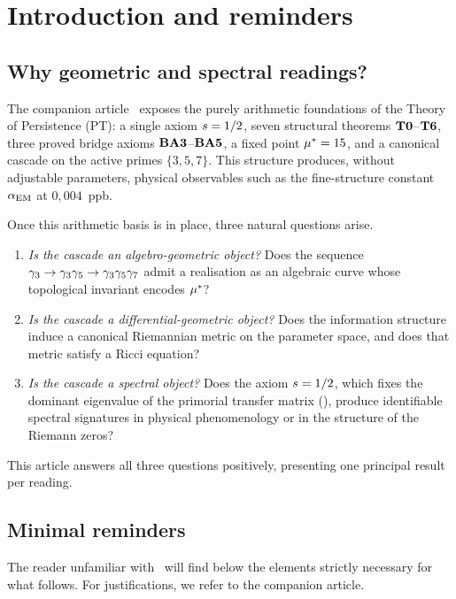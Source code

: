 \section{Introduction and reminders}
\label{sec:intro2}

\subsection{Why geometric and spectral readings?}
\label{sec:intro2:why}

The companion article~\cite{PT_Article1_Foundations} exposes the purely arithmetic foundations of the Theory of Persistence (PT): a single axiom $s = 1/2$, seven structural theorems $\textbf{T0}$--$\textbf{T6}$, three proved bridge axioms $\textbf{BA3}$--$\textbf{BA5}$, a fixed point $\mu^{*} = 15$, and a canonical cascade on the active primes $\{3,5,7\}$. This structure produces, without adjustable parameters, physical observables such as the fine-structure constant $\alpha_{\rm EM}$ at $0{,}004$~ppb.

Once this arithmetic basis is in place, three natural questions arise.
\begin{enumerate}[nosep,leftmargin=*]
\item \emph{Is the cascade an algebro-geometric object?} Does the sequence $\gamma_{3} \to \gamma_{3}\gamma_{5} \to \gamma_{3}\gamma_{5}\gamma_{7}$ admit a realisation as an algebraic curve whose topological invariant encodes $\mu^{*}$?
\item \emph{Is the cascade a differential-geometric object?} Does the information structure induce a canonical Riemannian metric on the parameter space, and does that metric satisfy a Ricci equation?
\item \emph{Is the cascade a spectral object?} Does the axiom $s = 1/2$, which fixes the dominant eigenvalue of the primorial transfer matrix (\Ttwo), produce identifiable spectral signatures in physical phenomenology or in the structure of the Riemann zeros?
\end{enumerate}
This article answers all three questions positively, presenting one principal result per reading.

\subsection{Minimal reminders}
\label{sec:intro2:rappels}

The reader unfamiliar with~\cite{PT_Article1_Foundations} will find below the elements strictly necessary for what follows. For justifications, we refer to the companion article.

